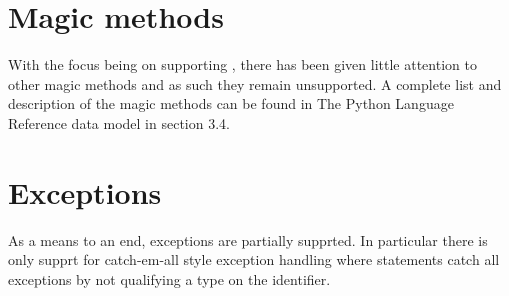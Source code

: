 \section{Magic methods}
With the focus being on supporting , there has been given little attention to other magic methods and as such they remain unsupported. A complete list and description of the magic methods can be found in The Python Language Reference data model\cite{pyref.datamodel} in section 3.4.

\section{Exceptions}
As a means to an end, exceptions are partially supprted. In particular there is only supprt for catch-em-all style exception handling where  statements catch all exceptions by not qualifying a type on the identifier.
